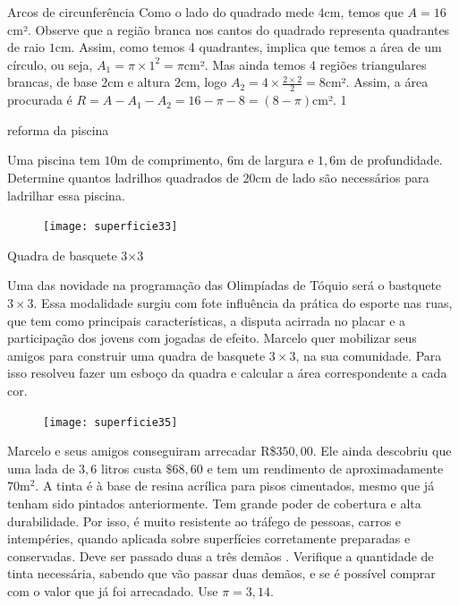 \marginpar{\vspace{.5em}}
\begin{answer}{Arcos de circunferência}
{
Como o lado do quadrado mede $4$cm, temos que $A=16$cm². Observe que a região branca nos cantos do quadrado representa quadrantes de raio $1$cm. Assim, como temos 4 quadrantes, implica que temos a área de um círculo, ou seja, $A_1=\pi\times1^2=\pi$cm². Mas ainda temos 4 regiões triangulares brancas, de base $2$cm e altura $2$cm, logo $A_2=4\times\frac{2\times2}{2}=8$cm². Assim, a área procurada é $R=A-A_1-A_2=16-\pi-8=(8-\pi)$cm².
}{1}
\end{answer}


\begin{task}{reforma da piscina}

Uma piscina tem $10$m de comprimento, $6$m de largura e $1{,}6$m de profundidade. Determine quantos ladrilhos quadrados de $20$cm de lado são necessários para ladrilhar essa piscina.

\begin{figure}[H]
\centering

\texttt{[image: superficie33]}

\end{figure}
\end{task}

\begin{task}{Quadra de basquete 3$\bm{\times}$3}

Uma das novidade na programação das Olimpíadas de Tóquio será o bastquete $3\times3$. Essa modalidade surgiu com fote influência da prática do esporte nas ruas, que tem como principais características, a disputa acirrada no placar e a participação dos jovens com jogadas de efeito. Marcelo quer mobilizar seus amigos para construir uma quadra de basquete $3\times3$, na sua comunidade. Para isso resolveu fazer um esboço da quadra e calcular a área correspondente a cada cor.

\begin{figure}[H]
\centering

\texttt{[image: superficie35]}

\end{figure}

Marcelo e seus amigos conseguiram arrecadar R\$$350{,}00$. Ele ainda descobriu que uma lada de $3{,}6$ litros custa $\$68{,}60$ e tem um rendimento de aproximadamente $70$m$^2$. A tinta é à base de resina acrílica para pisos cimentados, mesmo que já tenham sido pintados anteriormente. Tem grande poder de cobertura e alta durabilidade. Por isso, é muito resistente ao tráfego de pessoas, carros e intempéries, quando aplicada sobre superfícies corretamente preparadas e conservadas. Deve ser passado duas a três demãos %
. Verifique a quantidade de tinta necessária, sabendo que vão passar duas demãos, e se é possível comprar com o valor que já foi arrecadado. Use $\pi=3{,}14$.
\end{task}

